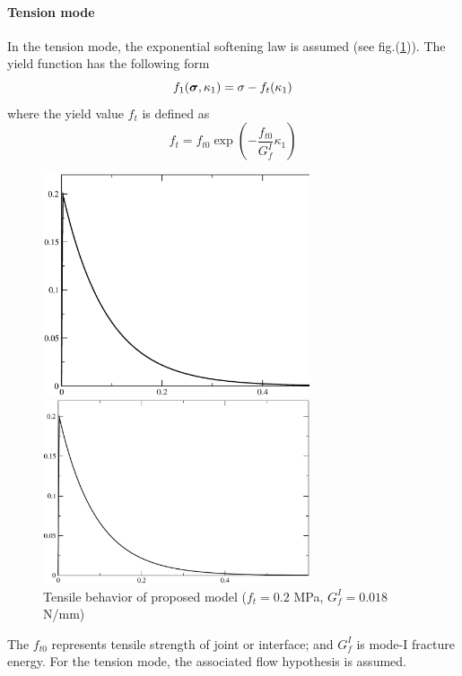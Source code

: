 \documentclass[a4paper]{article}
\newcommand{\mbf}[1]{\mbox{\boldmath$#1$}}
\newcommand{\del}[2]{\mbox{$\displaystyle\frac{#1}{#2}$}}
\newcommand{\sig}{\mbf{\sigma}}
\begin{document}
\paragraph{Tension mode}
In the tension mode, the exponential softening law is assumed (see fig.(\ref{tensfig})). The yield function has the following form
\begin{equation}
  f_1(\sig,\kappa_1) = \sigma-f_t(\kappa_1)
\end{equation}
where the yield value $f_t$ is defined as
\begin{equation}
\label{ft}
  f_t=f_{t0}\exp\left(-\del{f_{t0}}{G^I_f}\kappa_1\right)
\end{equation}
\begin{figure}[!htb]
\begin{htmlonly}
  \centerline{\includegraphics[width=0.7\textwidth]{tension.eps}}
\end{htmlonly}
 \centerline{\includegraphics[width=0.7\textwidth]{tension}}
  \caption{Tensile behavior of proposed model ($f_t=0.2$ MPa, $G_f^I=0.018$ N/mm)}
  \label{tensfig}
\end{figure}
The $f_{t0}$ represents tensile strength of joint or interface; and $G^I_f$ is mode-I fracture energy. For the tension mode, the associated flow hypothesis is assumed.
\end{document}
